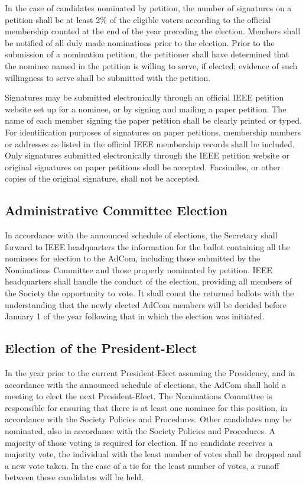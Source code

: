 \documentclass[10pt]{article}
\begin{document}
In the case of candidates nominated by petition, the number of signatures on a petition shall be at least 2\% of the eligible voters according to the official membership counted at the end of the year preceding the election. Members shall be notified of all duly made nominations prior to the election.  Prior to the submission of a nomination petition, the petitioner shall have determined that the nominee named in the petition is willing to serve, if elected; evidence of such willingness to serve shall be submitted with the petition. 

Signatures may be submitted electronically through an official IEEE petition website set up for a nominee, or by signing and mailing a paper petition.  The name of each member signing the paper petition shall be clearly printed or typed. For identification purposes of signatures on paper petitions, membership numbers or addresses as listed in the official IEEE membership records shall be included.  Only signatures submitted electronically through the IEEE petition website or original signatures on paper petitions shall be accepted.  Facsimiles, or other copies of the original signature, shall not be accepted.



\subsection{Administrative Committee Election}

In accordance with the announced schedule of elections, the Secretary shall forward to IEEE headquarters the information for the ballot containing all the nominees for election to the AdCom, including those submitted by the Nominations Committee and those properly nominated by petition.  IEEE headquarters shall handle the conduct of the election, providing all members of the Society the opportunity to vote.  It shall count the returned ballots with the understanding that the newly elected AdCom members will be decided before January 1 of the year following that in which the election was initiated.

\subsection{Election of the President-Elect}

In the year prior to the current President-Elect assuming the Presidency, and in accordance with the announced schedule of elections, the AdCom shall hold a meeting to elect the next President-Elect.  The Nominations Committee is responsible for ensuring that there is at least one nominee for this position, in accordance with the Society Policies and Procedures. Other candidates may be nominated, also in accordance with the Society Policies and Procedures. A majority of those voting is required for election.  If no candidate receives a majority vote, the individual with the least number of votes shall be dropped and a new vote taken. In the case of a tie for the least number of votes, a runoff between those candidates will be held. 
\end{document}
